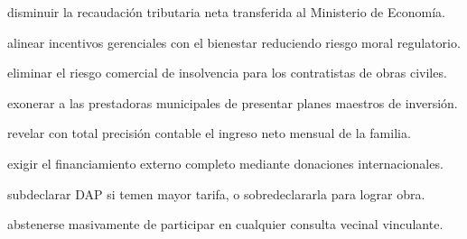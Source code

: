 \begin{opts}
    \item disminuir la recaudación tributaria neta transferida al Ministerio de Economía.
    \item alinear incentivos gerenciales con el bienestar reduciendo riesgo moral regulatorio.
    \item eliminar el riesgo comercial de insolvencia para los contratistas de obras civiles.
    \item exonerar a las prestadoras municipales de presentar planes maestros de inversión.
\end{opts}

\begin{opts}
    \item revelar con total precisión contable el ingreso neto mensual de la familia.
    \item exigir el financiamiento externo completo mediante donaciones internacionales.
    \item subdeclarar DAP si temen mayor tarifa, o sobredeclararla para lograr obra.
    \item abstenerse masivamente de participar en cualquier consulta vecinal vinculante.
\end{opts}

